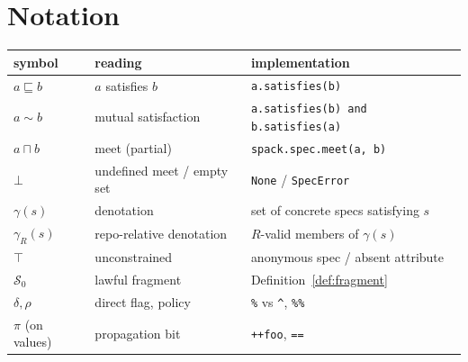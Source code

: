 \documentclass[11pt]{article}
\theoremstyle{definition}
\theoremstyle{remark}
\newcommand{\sat}{\sqsubseteq}
\renewcommand{\ker}{\sim}
\newcommand{\meet}{\sqcap}
\newcommand{\den}[1]{\gamma(#1)}
\newcommand{\denR}[1]{\gamma_{R}(#1)}
\newcommand{\Spec}{\mathcal{S}}
\newcommand{\code}[1]{\texttt{#1}}
\begin{document}
\section{Notation}
\begin{center}
\begin{tabular}{@{}lll@{}}
\toprule
symbol & reading & implementation \\
\midrule
$a \sat b$ & $a$ satisfies $b$ & \code{a.satisfies(b)} \\
$a \ker b$ & mutual satisfaction & \code{a.satisfies(b) and b.satisfies(a)} \\
$a \meet b$ & meet (partial) & \code{spack.spec.meet(a, b)} \\
$\bot$ & undefined meet / empty set & \code{None} / \code{SpecError} \\
$\den{s}$ & denotation & set of concrete specs satisfying $s$ \\
$\denR{s}$ & repo-relative denotation & $R$-valid members of $\den{s}$ \\
$\top$ & unconstrained & anonymous spec / absent attribute \\
$\Spec_0$ & lawful fragment & Definition~\ref{def:fragment} \\
$\delta, \rho$ & direct flag, policy & \code{\%} vs \code{\^{}}, \code{\%\%} \\
$\pi$ (on values) & propagation bit & \code{++foo}, \code{==} \\
\bottomrule
\end{tabular}
\end{center}
\end{document}
